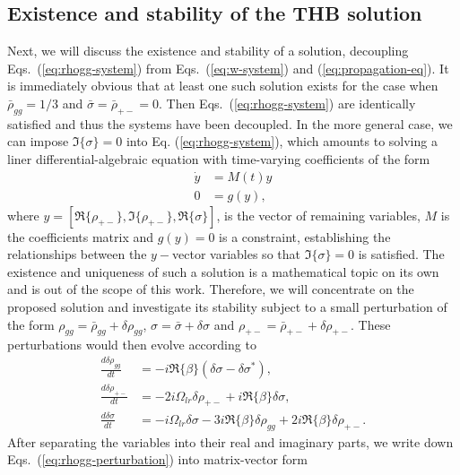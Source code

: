 \documentclass[onecolumn,secnumarabic,amssymb, nobibnotes, aip, prd]{revtex4-1}
\begin{document}
\begin{appendices}
\subsection{Existence and stability of the THB solution}
\label{subsec:sup-existence}
Next, we will discuss the existence and stability of a solution, decoupling Eqs.~(\ref{eq:rhogg-system}) from Eqs.~(\ref{eq:w-system}) and (\ref{eq:propagation-eq}). It is immediately obvious that at least one such solution exists for the case when $\bar\rho_{gg} = 1/3$ and $\bar\sigma = \bar\rho_{+-} = 0$. Then Eqs.~(\ref{eq:rhogg-system}) are identically satisfied and thus the systems have been decoupled. In the more general case, we can impose $\Im\{\sigma\}=0$ into Eq. (\ref{eq:rhogg-system}), which amounts to solving a liner differential-algebraic equation with time-varying coefficients of the form 
\begin{subequations}
	\begin{align}
	\dot{y} &= M(t)y \label{eq:diffequation} \\
	0 &= g(y) \label{eq:algebraicequation},
	\end{align}
\end{subequations}
where $y = [\Re\{\rho_{+-}\},\Im\{\rho_{+-}\},\Re\{\sigma\}]$, is the vector of remaining variables, $M$ is the coefficients matrix and $g(y) =0 $ is a constraint, establishing the relationships between the $y-$vector variables so that $\Im\{\sigma\} = 0$ is satisfied. The existence and uniqueness of such a solution is a mathematical topic on its own and is out of the scope of this work. Therefore, we will concentrate on the proposed solution and investigate its stability subject to a small perturbation of the form $\rho_{gg}=\bar{\rho}_{gg}+\delta\rho_{gg}$, $\sigma = \bar{\sigma} + \delta\sigma$ and $\rho_{+-} = \bar{\rho}_{+-} + \delta\rho_{+-}$. These perturbations would then evolve according to 
\begin{subequations}
	\label{eq:rhogg-perturbation}
	\begin{align}
	\frac{d \delta\rho_{gg}}{dt} &= - i\Re\{\beta\}(\delta\sigma-\delta\sigma^*), \\
	\frac{d \delta\rho_{+-}}{dt} &= -2i\Omega_{lr}\delta\rho_{+-}+i\Re\{\beta\}\delta\sigma,\\
	\frac{d \delta\sigma}{dt} &= -i\Omega_{lr}\delta\sigma-3i\Re\{\beta\}\delta\rho_{gg}+2i\Re\{\beta\}\delta\rho_{+-}.
	\end{align}
\end{subequations}
After separating the variables into their real and imaginary parts, we write down Eqs.~(\ref{eq:rhogg-perturbation}) into matrix-vector form 

\end{appendices}
\end{document}
